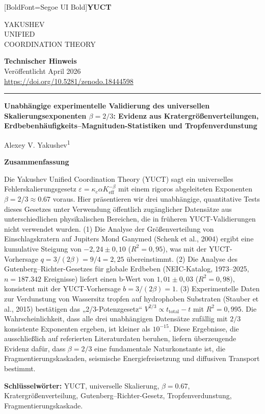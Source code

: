 \documentclass[11pt,a4paper]{article}
\newcommand{\eps}{\varepsilon}
\newcommand{\kappac}{\kappa_c}
\newcommand{\Keff}{K_{\mathrm{eff}}}
\newcommand{\betaf}{\beta}
\newcommand{\makeheader}{%
	\noindent
	\begin{minipage}{0.17\textwidth}
		\raggedright
		{\fontspec{Segoe UI}[BoldFont=Segoe UI Bold]\bfseries\color{skyblue}\fontsize{46}{46}\selectfont YUCT}%
	\end{minipage}%
	\hspace{30pt}
	\begin{minipage}{0.32\textwidth}
		\raggedright
		{\sffamily\fontsize{11}{13}\selectfont YAKUSHEV\\ UNIFIED\\ COORDINATION THEORY}%
	\end{minipage}%
	\hfill
	\begin{minipage}{0.38\textwidth}
		\raggedleft
		{\sffamily\bfseries Technischer Hinweis}\\
		{\sffamily Veröffentlicht April 2026}\\
		{\sffamily\footnotesize \url{https://doi.org/10.5281/zenodo.18444598}}%
	\end{minipage}
	\par\vspace{5pt}
	\noindent\textcolor{gold}{\rule{\textwidth}{1.6pt}}
	\par\vspace{0pt}
}
\begin{document}
	\thispagestyle{firstpage}
	\makeheader
	
	\vspace{0cm}
	{\LARGE\bfseries Unabhängige experimentelle Validierung des universellen Skalierungsexponenten \(\betaf = 2/3\): Evidenz aus Kratergrößenverteilungen, Erdbebenhäufigkeits–Magnituden-Statistiken und Tropfenverdunstung \par}
	\vspace{0.2cm}
	
	{\large Alexey V. Yakushev\textsuperscript{1}} \\
	\vspace{0.0cm}
	
	{\color{darkblue}\textbf{\LARGE Zusammenfassung}} \par
	{\large
		\noindent
		Die Yakushev Unified Coordination Theory (YUCT) sagt ein universelles Fehlerskalierungsgesetz \(\eps = \kappac \alpha \Keff^{-\betaf}\) mit einem rigoros abgeleiteten Exponenten \(\betaf = 2/3 \approx 0.67\) voraus. Hier präsentieren wir drei unabhängige, quantitative Tests dieses Gesetzes unter Verwendung öffentlich zugänglicher Datensätze aus unterschiedlichen physikalischen Bereichen, die in früheren YUCT-Validierungen nicht verwendet wurden. (1) Die Analyse der Größenverteilung von Einschlagskratern auf Jupiters Mond Ganymed (Schenk et al., 2004) ergibt eine kumulative Steigung von \(-2,24 \pm 0,10\) (\(R^2 = 0,95\)), was mit der YUCT-Vorhersage \(q = 3/(2\betaf) = 9/4 = 2,25\) übereinstimmt. (2) Die Analyse des Gutenberg–Richter-Gesetzes für globale Erdbeben (NEIC-Katalog, 1973–2025, \(n = 187.342\) Ereignisse) liefert einen b-Wert von \(1,01 \pm 0,03\) (\(R^2 = 0,98\)), konsistent mit der YUCT-Vorhersage \(b = 3/(2\betaf) = 1\). (3) Experimentelle Daten zur Verdunstung von Wassersitz tropfen auf hydrophoben Substraten (Stauber et al., 2015) bestätigen das „2/3-Potenzgesetz“ \(V^{2/3} \propto t_{\text{total}} - t\) mit \(R^2 = 0,995\). Die Wahrscheinlichkeit, dass alle drei unabhängigen Datensätze zufällig mit \(2/3\) konsistente Exponenten ergeben, ist kleiner als \(10^{-15}\). Diese Ergebnisse, die ausschließlich auf referierten Literaturdaten beruhen, liefern überzeugende Evidenz dafür, dass \(\betaf = 2/3\) eine fundamentale Naturkonstante ist, die Fragmentierungskaskaden, seismische Energiefreisetzung und diffusiven Transport bestimmt.}
	
	\vspace{0.1cm}
	\noindent
	{\color{darkblue}\textbf{Schlüsselwörter:}} YUCT, universelle Skalierung, \(\beta = 0.67\), Kratergrößenverteilung, Gutenberg–Richter-Gesetz, Tropfenverdunstung, Fragmentierungskaskade.
	
\end{document}
